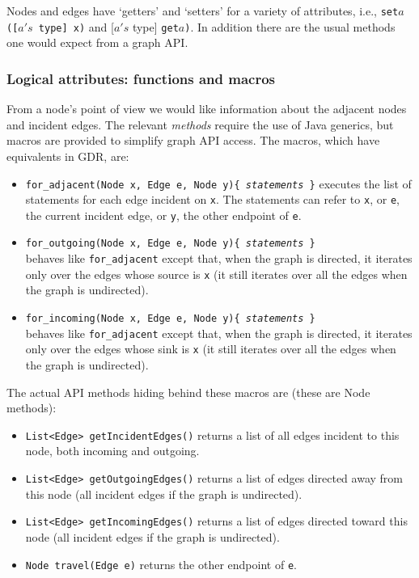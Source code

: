 Nodes and edges have `getters' and `setters' for
a variety of attributes, i.e.,
\texttt{set}$a$\texttt{([$a's$ type] x)} and [$a's$ type]
\texttt{get}$a$\texttt{)}.
In addition there are the usual methods one would expect from a graph API.

\subsubsection*{Logical attributes: functions and macros}

From a node's point of view we would like information about the adjacent nodes and incident edges.
The relevant \emph{methods} require the use of Java generics, but macros are provided
to simplify graph API access. The macros, which have equivalents in GDR, are:

\begin{itemize}

\item
\texttt{for\_adjacent(Node x, Edge e, Node y)\{ \emph{statements} \}}
executes the list of statements for each edge incident on \verb$x$.
The statements can refer to \verb$x$, or \verb$e$, the current incident edge,
or \verb$y$, the other endpoint of \verb$e$.

\item
\texttt{for\_outgoing(Node x, Edge e, Node y)\{ \emph{statements} \}}\\
behaves like \texttt{for\_adjacent} except that, when the graph is directed,
it iterates only over the edges whose source is \verb$x$ (it still iterates over all the edges when the graph is undirected). 

\item
\texttt{for\_incoming(Node x, Edge e, Node y)\{ \emph{statements} \}}\\
behaves like \texttt{for\_adjacent} except that, when the graph is directed,
it iterates only over the edges whose sink is \verb$x$ (it still iterates over all the edges when the graph is undirected). 

\end{itemize}

The actual API methods hiding behind these macros are (these are Node methods):

\begin{itemize}
\item
\texttt{List<Edge>~getIncidentEdges()} returns a list of all edges incident to this node,
both incoming and outgoing.
\item
\texttt{List<Edge>~getOutgoingEdges()} returns a list of edges directed away
from this node (all incident edges if the graph is undirected).
\item
\texttt{List<Edge>~getIncomingEdges()} returns a list of edges directed toward
this node (all incident edges if the graph is undirected).
\item
\texttt{Node~travel(Edge~e)} returns the other endpoint of \texttt{e}.
\end{itemize}

